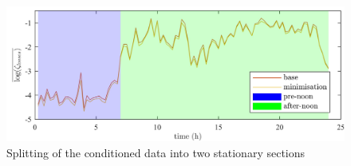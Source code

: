 \begin{figure}\centering
	\includegraphics{_appendices/_a1/fig/averaged-log-cost-split}
	\caption{Splitting of the conditioned data into two stationary sections}
	\label{appx-a:ch1:fig:split-averaged-log-data}
\end{figure}